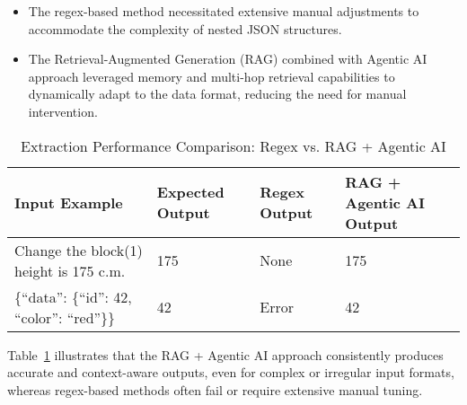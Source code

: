 \begin{itemize}
    \item The regex-based method necessitated extensive manual adjustments to accommodate the complexity of nested JSON structures.
    \item The Retrieval-Augmented Generation (RAG) combined with Agentic AI approach leveraged memory and multi-hop retrieval capabilities to dynamically adapt to the data format, reducing the need for manual intervention.
\end{itemize}



\begin{table}[ht]
\centering
\caption{Extraction Performance Comparison: Regex vs. RAG + Agentic AI}
\begin{tabular}{|p{4cm}|p{3cm}|p{3cm}|p{3cm}|}
\hline
\textbf{Input Example} & \textbf{Expected Output} & \textbf{Regex Output} & \textbf{RAG + Agentic AI Output} \\ \hline
Change the block(1) height is 175 c.m. & 175 & None & 175 \\ \hline
\{``data'': \{``id'': 42, ``color'': ``red''\}\} & 42 & Error & 42 \\ \hline
\end{tabular}
\label{tab:extraction_comparison}
\end{table}

\noindent
Table~\ref{tab:extraction_comparison} illustrates that the RAG + Agentic AI approach consistently produces accurate and context-aware outputs, even for complex or irregular input formats, whereas regex-based methods often fail or require extensive manual tuning.









